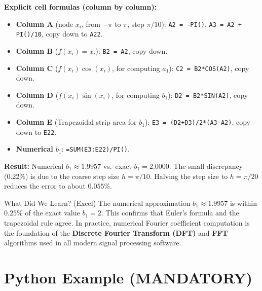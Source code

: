 \documentclass[12pt,a4paper]{article}
\begin{document}
\bigskip
\textbf{Explicit cell formulas (column by column):}
\begin{itemize}
  \item \textbf{Column A} (node $x_i$, from $-\pi$ to $\pi$, step $\pi/10$): \texttt{A2 = -PI()}, \texttt{A3 = A2 + PI()/10}, copy down to \texttt{A22}.
  \item \textbf{Column B} ($f(x_i) = x_i$): \texttt{B2 = A2}, copy down.
  \item \textbf{Column C} ($f(x_i)\cos(x_i)$, for computing $a_1$): \texttt{C2 = B2*COS(A2)}, copy down.
  \item \textbf{Column D} ($f(x_i)\sin(x_i)$, for computing $b_1$): \texttt{D2 = B2*SIN(A2)}, copy down.
  \item \textbf{Column E} (Trapezoidal strip area for $b_1$): \texttt{E3 = (D2+D3)/2*(A3-A2)}, copy down to \texttt{E22}.
  \item \textbf{Numerical $b_1$}: \texttt{=SUM(E3:E22)/PI()}.
\end{itemize}

\textbf{Result:} Numerical $b_1 \approx 1.9957$ vs.\ exact $b_1 = 2.0000$.
The small discrepancy (0.22\%) is due to the coarse step size $h = \pi/10$.
Halving the step size to $h = \pi/20$ reduces the error to about $0.055\%$.

\begin{learnbox}{What Did We Learn? (Excel)}
The numerical approximation $b_1 \approx 1.9957$ is within $0.25\%$ of the exact value $b_1 = 2$.
This confirms that Euler's formula and the trapezoidal rule agree.
In practice, numerical Fourier coefficient computation is the foundation of the \textbf{Discrete Fourier Transform (DFT)} and \textbf{FFT} algorithms used in all modern signal processing software.
\end{learnbox}

\section{Python Example (MANDATORY)}
\end{document}
